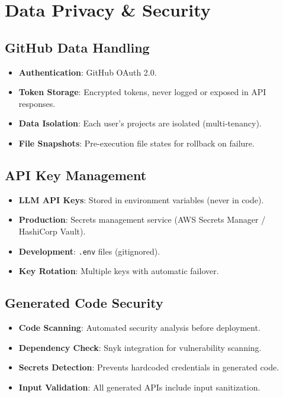 \documentclass[11pt,a4paper]{article}
\begin{document}
\section{Data Privacy \& Security}

\subsection{GitHub Data Handling}

\begin{itemize}
  \item \textbf{Authentication}: GitHub OAuth 2.0.
  \item \textbf{Token Storage}: Encrypted tokens, never logged or exposed in API responses.
  \item \textbf{Data Isolation}: Each user's projects are isolated (multi-tenancy).
  \item \textbf{File Snapshots}: Pre-execution file states for rollback on failure.
\end{itemize}

\subsection{API Key Management}

\begin{itemize}
  \item \textbf{LLM API Keys}: Stored in environment variables (never in code).
  \item \textbf{Production}: Secrets management service (AWS Secrets Manager / HashiCorp Vault).
  \item \textbf{Development}: \texttt{.env} files (gitignored).
  \item \textbf{Key Rotation}: Multiple keys with automatic failover.
\end{itemize}

\subsection{Generated Code Security}

\begin{itemize}
  \item \textbf{Code Scanning}: Automated security analysis before deployment.
  \item \textbf{Dependency Check}: Snyk integration for vulnerability scanning.
  \item \textbf{Secrets Detection}: Prevents hardcoded credentials in generated code.
  \item \textbf{Input Validation}: All generated APIs include input sanitization.
\end{itemize}
\end{document}
